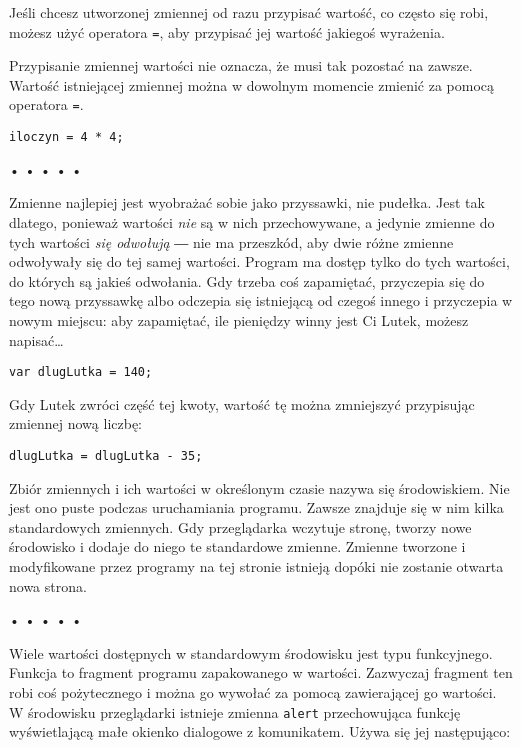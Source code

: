     
Jeśli chcesz utworzonej zmiennej od razu przypisać wartość, co często się robi, możesz użyć operatora \texttt{=}\index{=}, aby przypisać jej wartość jakiegoś wyrażenia.

    
Przypisanie zmiennej wartości nie oznacza, że musi tak pozostać na zawsze. Wartość istniejącej zmiennej można w dowolnym momencie zmienić za pomocą operatora \texttt{=}.

\begin{verbatim} 
iloczyn = 4 * 4;
\end{verbatim}
  
\begin{center}
• • • • •
\end{center}
  
    
Zmienne najlepiej jest wyobrażać sobie jako przyssawki, nie pudełka. Jest tak dlatego, ponieważ wartości \emph{nie} są w nich przechowywane, a jedynie zmienne do tych wartości \emph{się odwołują} ― nie ma przeszkód, aby dwie różne zmienne odwoływały się do tej samej wartości. Program ma dostęp tylko do tych wartości, do których są jakieś odwołania. Gdy trzeba coś zapamiętać, przyczepia się do tego nową przyssawkę albo odczepia się istniejącą od czegoś innego i przyczepia w nowym miejscu: aby zapamiętać, ile pieniędzy winny jest Ci Lutek, możesz napisać…

\begin{verbatim} 
var dlugLutka = 140;
\end{verbatim}
    
Gdy Lutek zwróci część tej kwoty, wartość tę można zmniejszyć przypisując zmiennej nową liczbę:

\begin{verbatim} 
dlugLutka = dlugLutka - 35;
\end{verbatim}
    
Zbiór zmiennych i ich wartości w określonym czasie nazywa się środowiskiem. Nie jest ono puste podczas uruchamiania programu. Zawsze znajduje się w nim kilka standardowych zmiennych. Gdy przeglądarka wczytuje stronę, tworzy nowe środowisko i dodaje do niego te standardowe zmienne. Zmienne tworzone i modyfikowane przez programy na tej stronie istnieją dopóki nie zostanie otwarta nowa strona.

  
\begin{center}
• • • • •
\end{center}
  
    
Wiele wartości dostępnych w standardowym środowisku jest typu funkcyjnego. Funkcja to fragment programu zapakowanego w wartości. Zazwyczaj fragment ten robi coś pożytecznego i można go wywołać za pomocą zawierającej go wartości. W środowisku przeglądarki istnieje zmienna \texttt{alert} przechowująca funkcję wyświetlającą małe okienko dialogowe z komunikatem. Używa się jej następująco:

